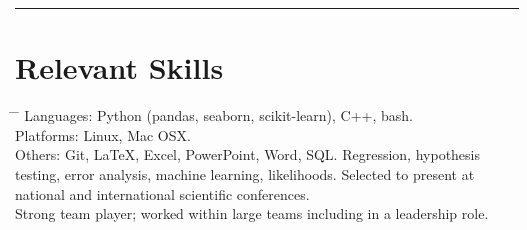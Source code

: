 \documentclass[10pt]{article} %
\begin{document}
\vspace{0.2mm}
\rule{\textwidth}{0.5mm}



\vspace{-1mm}
\section{Relevant Skills}
\begin{tabbing}
  \hspace{3mm} \= \hspace{30mm} \= \kill 
        {
          Languages: Python (pandas, seaborn, scikit-learn), C++, bash. \\
          \>\>Platforms: Linux, Mac OSX. \\
          \>\>Others: Git, LaTeX, Excel, PowerPoint, Word, SQL.
        }
    { Regression, hypothesis testing, error analysis, machine learning, likelihoods. }
        {
          Selected to present at national and international scientific conferences.\\
          \>\>Strong team player; worked within large teams including in a leadership role.
        }
\end{tabbing}


\vspace{-9mm}
\end{document}
